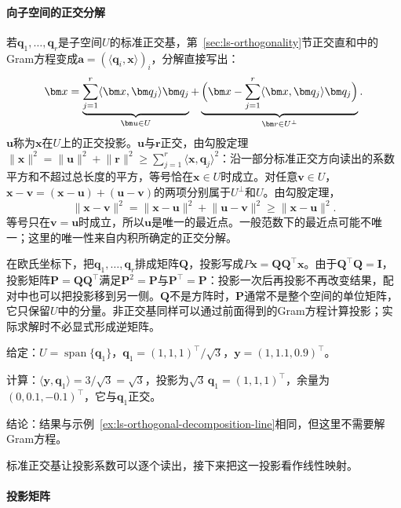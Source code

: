 \paragraph{向子空间的正交分解}
若$\bm q_1,\ldots,\bm q_r$是子空间$U$的标准正交基，第~\ref{sec:ls-orthogonality}节正交直和中的Gram方程变成$\bm a=(\langle\bm q_i,\bm x\rangle)_i$，分解直接写出：
\begin{equation}
 \bm x=\underbrace{\sum_{j=1}^r\langle\bm x,\bm q_j\rangle\bm q_j}_{\bm u\in U}+\underbrace{\Bigl(\bm x-\sum_{j=1}^r\langle\bm x,\bm q_j\rangle\bm q_j\Bigr)}_{\bm r\in U^\perp}.
 \label{eq:ls-orthonormal-projection}
\end{equation}
$\bm u$称为$\bm x$在$U$上的正交投影。$\bm u$与$\bm r$正交，由勾股定理$\lVert\bm x\rVert^2=\lVert\bm u\rVert^2+\lVert\bm r\rVert^2\geq\sum_{j=1}^r\langle\bm x,\bm q_j\rangle^2$：沿一部分标准正交方向读出的系数平方和不超过总长度的平方，等号恰在$\bm x\in U$时成立。对任意$\bm v\in U$，$\bm x-\bm v=(\bm x-\bm u)+(\bm u-\bm v)$的两项分别属于$U^\perp$和$U$。由勾股定理，
\[
 \lVert\bm x-\bm v\rVert^2=\lVert\bm x-\bm u\rVert^2+\lVert\bm u-\bm v\rVert^2\geq\lVert\bm x-\bm u\rVert^2.
\]
等号只在$\bm v=\bm u$时成立，所以$\bm u$是唯一的最近点。一般范数下的最近点可能不唯一；这里的唯一性来自内积所确定的正交分解。

在欧氏坐标下，把$\bm q_1,\ldots,\bm q_r$排成矩阵$\bm Q$，投影写成$P\bm x=\bm Q\bm Q^\top\bm x$。由于$\bm Q^\top\bm Q=\bm I$，投影矩阵$\bm P=\bm Q\bm Q^\top$满足$\bm P^2=\bm P$与$\bm P^\top=\bm P$：投影一次后再投影不再改变结果，配对中也可以把投影移到另一侧。$\bm Q$不是方阵时，$\bm P$通常不是整个空间的单位矩阵，它只保留$U$中的分量。非正交基同样可以通过前面得到的Gram方程计算投影；实际求解时不必显式形成逆矩阵。

\begin{example}[用标准正交基重算正交分解]
\label{ex:ls-orthonormal-projection-line}
给定：$U=\operatorname{span}\{\bm q_1\}$，$\bm q_1=(1,1,1)^\top/\sqrt3$，$\bm y=(1,1.1,0.9)^\top$。

计算：$\langle\bm y,\bm q_1\rangle=3/\sqrt3=\sqrt3$，投影为$\sqrt3\,\bm q_1=(1,1,1)^\top$，余量为$(0,0.1,-0.1)^\top$，它与$\bm q_1$正交。

结论：结果与示例~\ref{ex:ls-orthogonal-decomposition-line}相同，但这里不需要解Gram方程。
\end{example}
标准正交基让投影系数可以逐个读出，接下来把这一投影看作线性映射。

\paragraph{投影矩阵}
\label{sec:ls-projection-matrices}

